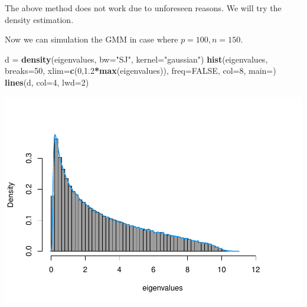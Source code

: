 \documentclass[
]{article}
\newenvironment{Shaded}{\begin{snugshade}}{\end{snugshade}}
\newcommand{\AttributeTok}[1]{\textcolor[rgb]{0.13,0.29,0.53}{#1}}
\newcommand{\ConstantTok}[1]{\textcolor[rgb]{0.56,0.35,0.01}{#1}}
\newcommand{\DecValTok}[1]{\textcolor[rgb]{0.00,0.00,0.81}{#1}}
\newcommand{\FloatTok}[1]{\textcolor[rgb]{0.00,0.00,0.81}{#1}}
\newcommand{\FunctionTok}[1]{\textcolor[rgb]{0.13,0.29,0.53}{\textbf{#1}}}
\newcommand{\NormalTok}[1]{#1}
\newcommand{\OtherTok}[1]{\textcolor[rgb]{0.56,0.35,0.01}{#1}}
\newcommand{\SpecialCharTok}[1]{\textcolor[rgb]{0.81,0.36,0.00}{\textbf{#1}}}
\newcommand{\StringTok}[1]{\textcolor[rgb]{0.31,0.60,0.02}{#1}}
\begin{document}
The above method does not work due to unforeseen reasons. We will try
the density estimation.

Now we can simulation the GMM in case where \(p =100, n = 150\).

\begin{Shaded}
\end{Shaded}

\begin{Shaded}
\begin{Highlighting}[]
\NormalTok{d }\OtherTok{=} \FunctionTok{density}\NormalTok{(eigenvalues, }\AttributeTok{bw=}\StringTok{"SJ"}\NormalTok{, }\AttributeTok{kernel=}\StringTok{"gaussian"}\NormalTok{)}
\FunctionTok{hist}\NormalTok{(eigenvalues, }\AttributeTok{breaks=}\DecValTok{50}\NormalTok{, }\AttributeTok{xlim=}\FunctionTok{c}\NormalTok{(}\DecValTok{0}\NormalTok{,}\FloatTok{1.2}\SpecialCharTok{*}\FunctionTok{max}\NormalTok{(eigenvalues)), }\AttributeTok{freq=}\ConstantTok{FALSE}\NormalTok{, }\AttributeTok{col=}\DecValTok{8}\NormalTok{, }\AttributeTok{main=}\StringTok{\textquotesingle{}\textquotesingle{}}\NormalTok{)}
\FunctionTok{lines}\NormalTok{(d, }\AttributeTok{col=}\DecValTok{4}\NormalTok{, }\AttributeTok{lwd=}\DecValTok{2}\NormalTok{)}
\end{Highlighting}
\end{Shaded}

\includegraphics{A5_files/figure-latex/unnamed-chunk-43-1.pdf}
\end{document}

